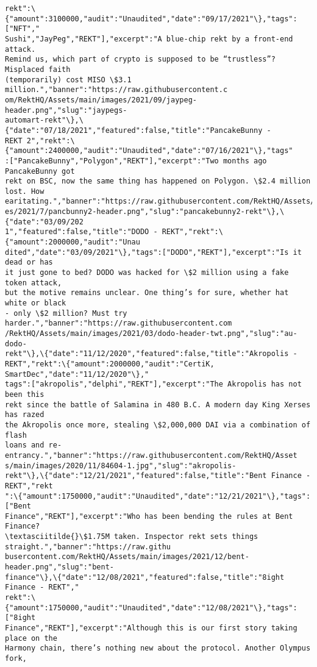 \documentclass[11pt]{article}
\begin{document}
\begin{Verbatim}[commandchars=\\\{\}]
rekt":\{"amount":3100000,"audit":"Unaudited","date":"09/17/2021"\},"tags":["NFT","
Sushi","JayPeg","REKT"],"excerpt":"A blue-chip rekt by a front-end attack.
Remind us, which part of crypto is supposed to be “trustless”? Misplaced faith
(temporarily) cost MISO \$3.1 million.","banner":"https://raw.githubusercontent.c
om/RektHQ/Assets/main/images/2021/09/jaypeg-header.png","slug":"jaypegs-
automart-rekt"\},\{"date":"07/18/2021","featured":false,"title":"PancakeBunny -
REKT 2","rekt":\{"amount":2400000,"audit":"Unaudited","date":"07/16/2021"\},"tags"
:["PancakeBunny","Polygon","REKT"],"excerpt":"Two months ago PancakeBunny got
rekt on BSC, now the same thing has happened on Polygon. \$2.4 million lost. How 
earitating.","banner":"https://raw.githubusercontent.com/RektHQ/Assets/main/imag
es/2021/7/pancbunny2-header.png","slug":"pancakebunny2-rekt"\},\{"date":"03/09/202
1","featured":false,"title":"DODO - REKT","rekt":\{"amount":2000000,"audit":"Unau
dited","date":"03/09/2021"\},"tags":["DODO","REKT"],"excerpt":"Is it dead or has
it just gone to bed? DODO was hacked for \$2 million using a fake token attack,
but the motive remains unclear. One thing’s for sure, whether hat white or black
- only \$2 million? Must try harder.","banner":"https://raw.githubusercontent.com
/RektHQ/Assets/main/images/2021/03/dodo-header-twt.png","slug":"au-dodo-
rekt"\},\{"date":"11/12/2020","featured":false,"title":"Akropolis -
REKT","rekt":\{"amount":2000000,"audit":"CertiK, SmartDec","date":"11/12/2020"\},"
tags":["akropolis","delphi","REKT"],"excerpt":"The Akropolis has not been this
rekt since the battle of Salamina in 480 B.C. A modern day King Xerses has razed
the Akropolis once more, stealing \$2,000,000 DAI via a combination of flash
loans and re-entrancy.","banner":"https://raw.githubusercontent.com/RektHQ/Asset
s/main/images/2020/11/84604-1.jpg","slug":"akropolis-
rekt"\},\{"date":"12/21/2021","featured":false,"title":"Bent Finance - REKT","rekt
":\{"amount":1750000,"audit":"Unaudited","date":"12/21/2021"\},"tags":["Bent
Finance","REKT"],"excerpt":"Who has been bending the rules at Bent Finance?
\textasciitilde{}\$1.75M taken. Inspector rekt sets things straight.","banner":"https://raw.githu
busercontent.com/RektHQ/Assets/main/images/2021/12/bent-
header.png","slug":"bent-
finance"\},\{"date":"12/08/2021","featured":false,"title":"8ight Finance - REKT","
rekt":\{"amount":1750000,"audit":"Unaudited","date":"12/08/2021"\},"tags":["8ight
Finance","REKT"],"excerpt":"Although this is our first story taking place on the
Harmony chain, there’s nothing new about the protocol. Another Olympus fork,

\end{Verbatim}
\end{document}
